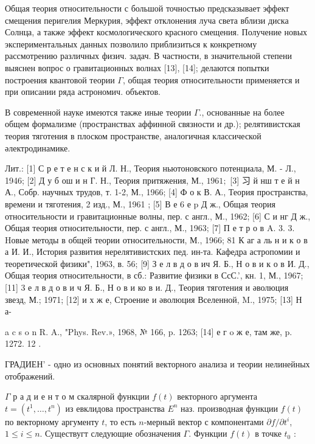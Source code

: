 \documentclass[10pt]{article}
\begin{document}
Общая теория относительности с большой точностью предсказывает эффект смещения перигелия Меркурия, эффект отклонения луча света вблизи диска Солнца, а также эффект космологического красного смещения. Получение новых экспериментальных данных позволило приблизиться к конкретному рассмотрению различных физич. задач. В частности, в значительной степени выяснен вопрос о гравитационных волнах [13], [14]; делаются попытки построения квантовой теории $\Gamma$, общая теория относительности применяется и при описании ряда астрономич. объектов.



В современной науке имеются также иные теории $\Gamma$., основанные на более общем формализме (пространствах аффинной связности и др.); релятивистская теория тяготения в плоском пространстве, аналогичная классической әлектродинамике.



Лит.: [1] С р е т е н с к и й Л. Н., Теория ньютоновского потенциала, М. - Л., 1946; [2] Д у б ош и н Г. Н., Теория притяжения, М., $1961 ;$ [3] $习$ й нш т е й н А., Собр. научных трудов, т. 1-2, М., 1966; [4] Ф о к В. А., Теория пространства, времени и тяготения, 2 изд., М., 1961 ; [5] В е 6 е p Д ж., Общая теория относительности и гравитационные волны, пер. с англ., М., 1962; [6] С и нг Д ж., Общая теория относительности, пер. с англ., М., 1963; [7] П е т р о в A. 3. 3. Hовые методы в общей теории относительности, М., 1966; 81 К аг а ль н и к о в а И. И., История развития нерелятивистских пед. ин-та. Кафедра астропомии и теоретической физики", 1963, в. 56; [9] З е л в д о в ич Я. Б., Н о в и к о в И. Д., Общая теория относительности, в сб.: Развитие физики в СсС.', кн. 1, М., 1967; [11] 3 е л в д о в и ч Я. Б., Н о в и ко в и. Д., Теория тяготения и әволюция звезд, М.; 1971; [12] и х ж е, Строение и әволюция Вселенной, M., 1975; [13] Н а-

a c s o n R. A., "Phys. Rev.», 1968, № 166, p. 1263; [14] е г o ж е, там же, p. 1272. 12 .



ГРАДИЕН' - одно из основных понятий векторного анализа и теории нелинейных отображений.



$\Gamma$ р а д и е н т о м скалярной функции $f(t)$ векторного аргумента $t=\left(t^{1}, \ldots, t^{n}\right)$ из евклидова пространства $E^{n}$ наз. производная функции $f(t)$ по векторному аргументу $t$, то есть $n$-мерный вектор с компонентами $\partial f / \partial t^{i}$, $1 \leqslant i \leqslant n$. Существугт следующие обозначения $\Gamma$. Функции $f(t)$ в точке $t_{0}$ :
\end{document}
